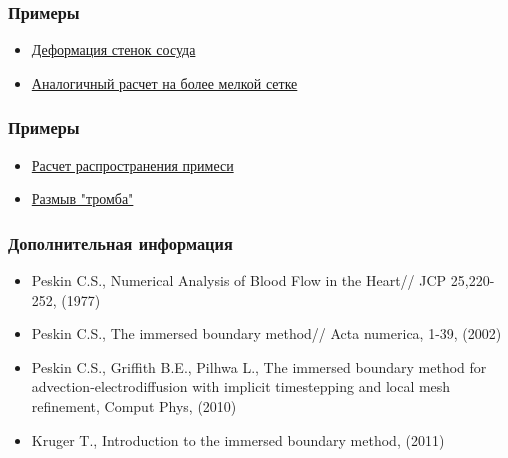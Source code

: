 \documentclass[14pt]{beamer}
\begin{document}
\begin{frame}
\frametitle{Примеры}
\begin{itemize}
    \item \href{run:video/cylinder1.avi}{Деформация стенок сосуда}
    \item \href{run:video/cylinder2.avi}{Аналогичный расчет на более мелкой сетке}
\end{itemize}
\end{frame}

\begin{frame}
\frametitle{Примеры}
\begin{itemize}
    \item \href{run:video/source_in_vessel.avi}{Расчет распространения примеси}
    \item \href{run:video/thrombus_in_vessel.avi}{Размыв "тромба"}
\end{itemize}
\end{frame}

\begin{frame}
\frametitle{Дополнительная информация}
    \begin{itemize}
        \item Peskin C.S., Numerical Analysis of Blood Flow in the Heart// JCP 25,220-252, (1977)
        \item Peskin C.S., The immersed boundary method// Acta numerica, 1-39, (2002)
        \item Peskin C.S., Griffith B.E., Pilhwa L., The immersed boundary method for advection-electrodiffusion with implicit timestepping and local mesh refinement, Comput Phys, (2010)
        \item Kruger T., Introduction to the immersed boundary method, (2011)
    \end{itemize}
\end{frame}
\end{document}
